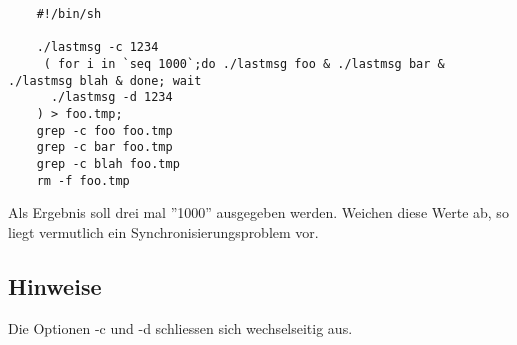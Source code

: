 \begin{verbatim}
	#!/bin/sh

	./lastmsg -c 1234
	 ( for i in `seq 1000`;do ./lastmsg foo & ./lastmsg bar & ./lastmsg blah & done; wait
	  ./lastmsg -d 1234 
	) > foo.tmp;
	grep -c foo foo.tmp
	grep -c bar foo.tmp
	grep -c blah foo.tmp
	rm -f foo.tmp
\end{verbatim}

Als Ergebnis soll drei mal ''1000'' ausgegeben werden. Weichen diese Werte
ab, so liegt vermutlich ein Synchronisierungsproblem vor.

\subsection*{Hinweise}

Die Optionen -c und -d schliessen sich wechselseitig aus.

\osueguidelinesthree




